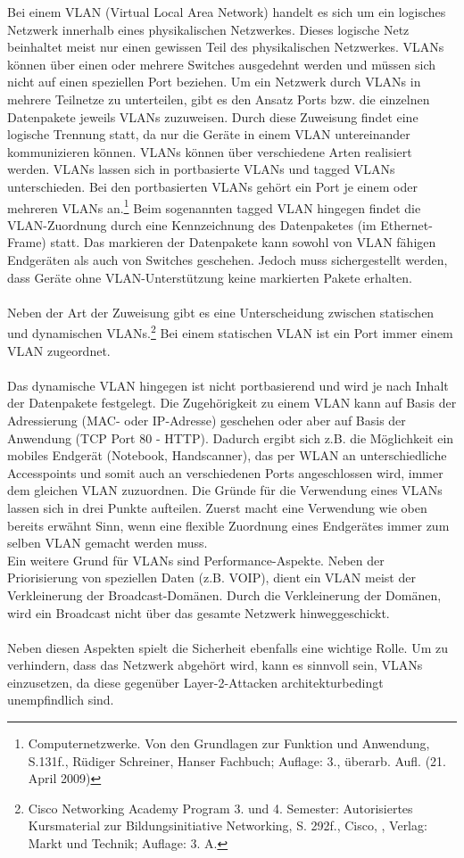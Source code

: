 Bei einem VLAN (Virtual Local Area Network) handelt es sich um ein logisches Netzwerk innerhalb eines physikalischen Netzwerkes.
Dieses logische Netz beinhaltet meist nur einen gewissen Teil des physikalischen Netzwerkes.
VLANs können über einen oder mehrere Switches ausgedehnt werden und müssen sich nicht auf einen speziellen Port beziehen.
Um ein Netzwerk durch VLANs in mehrere Teilnetze zu unterteilen, gibt es den Ansatz Ports bzw. die einzelnen Datenpakete jeweils VLANs zuzuweisen.
Durch diese Zuweisung findet eine logische Trennung statt, da nur die Geräte in einem VLAN untereinander kommunizieren können.
VLANs können über verschiedene Arten realisiert werden.
VLANs lassen sich in portbasierte VLANs und tagged VLANs unterschieden.
Bei den portbasierten VLANs gehört ein Port je einem oder mehreren VLANs an.\footnote{Computernetzwerke. Von den Grundlagen zur Funktion und Anwendung, S.131f., Rüdiger Schreiner, Hanser Fachbuch; Auflage: 3., überarb. Aufl. (21. April 2009)}
Beim sogenannten tagged VLAN hingegen findet die VLAN-Zuordnung durch eine Kennzeichnung des Datenpaketes (im Ethernet-Frame) statt.
Das markieren der Datenpakete kann sowohl von VLAN fähigen Endgeräten als auch von Switches geschehen.
Jedoch muss sichergestellt werden, dass Geräte ohne VLAN-Unterstützung keine markierten Pakete erhalten.\\\\
Neben der Art der Zuweisung gibt es eine Unterscheidung zwischen statischen und dynamischen VLANs.\footnote{Cisco Networking Academy Program 3. und 4. Semester: Autorisiertes Kursmaterial zur Bildungsinitiative Networking, S. 292f., Cisco, , Verlag: Markt und Technik; Auflage: 3. A. }
Bei einem statischen VLAN ist ein Port immer einem VLAN zugeordnet.\\\\
Das dynamische VLAN hingegen ist nicht portbasierend und wird je nach Inhalt der Datenpakete festgelegt.
Die Zugehörigkeit zu einem VLAN kann auf Basis der Adressierung (MAC- oder IP-Adresse) geschehen oder aber auf Basis der Anwendung (TCP Port 80 - HTTP).
Dadurch ergibt sich z.B. die Möglichkeit ein mobiles Endgerät (Notebook, Handscanner), das per WLAN an unterschiedliche Accesspoints und somit auch an verschiedenen Ports angeschlossen wird, immer dem gleichen VLAN zuzuordnen.
Die Gründe für die Verwendung eines VLANs lassen sich in drei Punkte aufteilen.
Zuerst macht eine Verwendung wie oben bereits erwähnt Sinn, wenn eine flexible Zuordnung eines Endgerätes immer zum selben VLAN gemacht werden muss.\\
Ein weitere Grund für VLANs sind Performance-Aspekte. Neben der Priorisierung von speziellen Daten (z.B. VOIP), dient ein VLAN meist der Verkleinerung der Broadcast-Domänen.
Durch die Verkleinerung der Domänen, wird ein Broadcast nicht über das gesamte Netzwerk hinweggeschickt.\\\\
Neben diesen Aspekten spielt die Sicherheit ebenfalls eine wichtige Rolle.
Um zu verhindern, dass das Netzwerk abgehört wird, kann es sinnvoll sein, VLANs einzusetzen, da diese gegenüber Layer-2-Attacken architekturbedingt unempfindlich sind.

